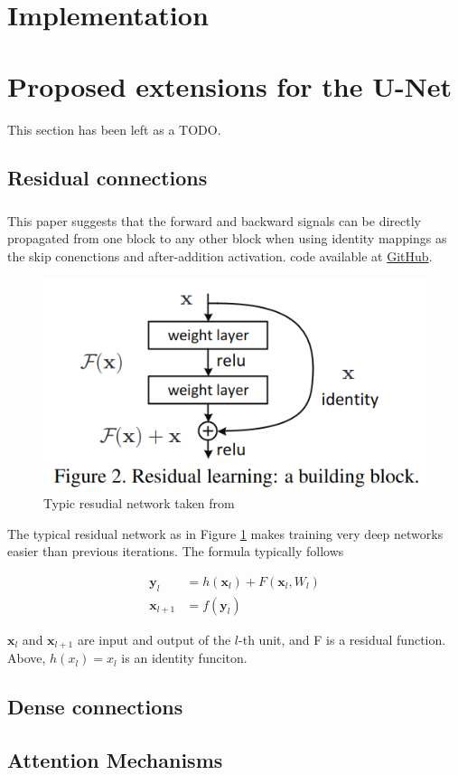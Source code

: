 \documentclass[11pt]{article}
\begin{document}
\section{Implementation}

\section{Proposed extensions for the U-Net}

This section has been left as a TODO.

\subsection{Residual connections}

\subsubsection{\cite{identity-mappings-drns}}

This paper suggests that the forward and backward signals can be directly propagated from one block to any other block when using identity mappings as the skip conenctions and after-addition activation. code available at \href{https://github.com/KaimingHe/resnet-1k-layers/blob/master/resnet-pre-act.lua}{GitHub}.

\begin{figure}[H]
    \centering
    \includegraphics[width=0.4\linewidth]{images/residualArchitecture.png}
    \caption{Typic resudial network taken from \cite{drn-for-image-recognition}}
    \label{residual-architecture}
\end{figure}

The typical residual network as in Figure \ref{residual-architecture} makes training very deep networks easier than previous iterations. The formula typically follows 

\begin{align}
    \textbf{y}_l &= h(\textbf{x}_l) + F(\textbf{x}_l, W_l) \\
    \textbf{x}_{l+1} &= f(\textbf{y}_l)
\end{align}

$\textbf{x}_l$ and $\textbf{x}_{l+1}$ are input and output of the $l$-th unit, and F is a residual function. Above, 
$h(x_l)=x_l$ is an identity funciton. 

\subsubsection{\cite{v-net}}

\subsection{Dense connections}

\cite{tiramisu-densenet}

\subsection{Attention Mechanisms}

\cite{attention-u-net}

\printbibliography
\end{document}
